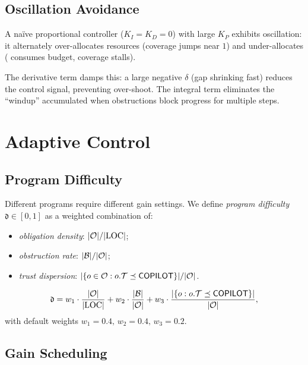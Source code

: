 \documentclass[11pt]{article}
\newcommand{\vdiff}{\delta}                %
\newcommand{\Kp}{K_P}                      %
\newcommand{\Ki}{K_I}                      %
\newcommand{\Kd}{K_D}                      %
\newcommand{\difficulty}{\mathfrak{d}}     %
\begin{document}
\subsection{Oscillation Avoidance}

A na\"ive proportional controller ($\Ki = \Kd = 0$) with large $\Kp$
exhibits oscillation: it alternately over-allocates \VERIFY{} resources
(coverage jumps near $1$) and under-allocates (\ESCALATE{} consumes
budget, coverage stalls).

The derivative term damps this: a large negative $\vdiff$ (gap
shrinking fast) reduces the control signal, preventing over-shoot.
The integral term eliminates the ``windup'' accumulated when obstructions
block progress for multiple steps.

\section{Adaptive Control}
\label{sec:adaptive}

\subsection{Program Difficulty}

Different programs require different gain settings.  We define
\emph{program difficulty} $\difficulty \in [0, 1]$ as a weighted
combination of:
\begin{itemize}
  \item \emph{obligation density}: $|\mathcal{O}| / |\mathrm{LOC}|$;
  \item \emph{obstruction rate}: $|\mathcal{B}| / |\mathcal{O}|$;
  \item \emph{trust dispersion}:
        $|\{o \in \mathcal{O} : o.\mathcal{T} \preceq \mathsf{COPILOT}\}| / |\mathcal{O}|$.
\end{itemize}

\begin{definition}
  \label{def:difficulty}
  \[
    \difficulty
      = w_1 \cdot \frac{|\oblig|}{|\mathrm{LOC}|}
      + w_2 \cdot \frac{|\obstr|}{|\oblig|}
      + w_3 \cdot \frac{|\{o : o.\trust \tleq \Tcopilot\}|}{|\oblig|},
  \]
  with default weights $w_1 = 0.4,\, w_2 = 0.4,\, w_3 = 0.2$.
\end{definition}

\subsection{Gain Scheduling}
\end{document}
